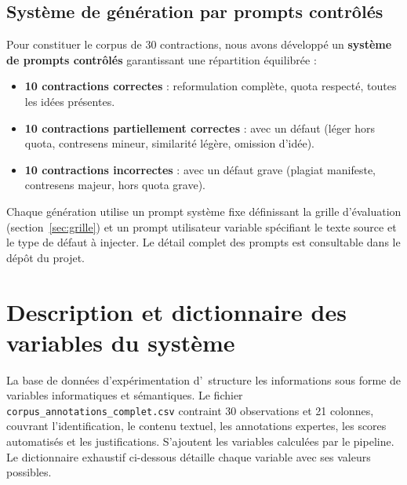 \subsection{Système de génération par prompts contrôlés}

Pour constituer le corpus de 30 contractions, nous avons développé un \textbf{système de prompts contrôlés} garantissant une répartition équilibrée :

\begin{itemize}
    \item \textbf{10 contractions correctes} : reformulation complète, quota respecté, toutes les idées présentes.
    \item \textbf{10 contractions partiellement correctes} : avec un défaut (léger hors quota, contresens mineur, similarité légère, omission d'idée).
    \item \textbf{10 contractions incorrectes} : avec un défaut grave (plagiat manifeste, contresens majeur, hors quota grave).
\end{itemize}

Chaque génération utilise un prompt système fixe définissant la grille d'évaluation (section~\ref{sec:grille}) et un prompt utilisateur variable spécifiant le texte source et le type de défaut à injecter. Le détail complet des prompts est consultable dans le dépôt du projet.

\section{Description et dictionnaire des variables du système}

La base de données d'expérimentation d'\AZIZA\ structure les informations sous forme de variables informatiques et sémantiques. Le fichier \texttt{corpus\_annotations\_complet.csv} contraint 30 observations et 21 colonnes, couvrant l'identification, le contenu textuel, les annotations expertes, les scores automatisés et les justifications. S'ajoutent les variables calculées par le pipeline. Le dictionnaire exhaustif ci-dessous détaille chaque variable avec ses valeurs possibles.

